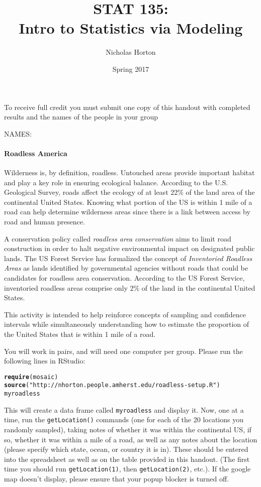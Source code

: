 \documentclass[10pt]{article}\usepackage[]{graphicx}\usepackage[]{color}
\title{STAT 135:\\Intro to Statistics via Modeling}
\author{Nicholas Horton}
\date{Spring 2017}
\makeatletter
\newcommand{\hlstr}[1]{\textcolor[rgb]{0.192,0.494,0.8}{#1}}%
\newcommand{\hlstd}[1]{\textcolor[rgb]{0.345,0.345,0.345}{#1}}%
\newcommand{\hlkwd}[1]{\textcolor[rgb]{0.737,0.353,0.396}{\textbf{#1}}}%
\newenvironment{kframe}{%
 \def\at@end@of@kframe{}%
 \ifinner\ifhmode%
  \def\at@end@of@kframe{\end{minipage}}%
  \begin{minipage}{\columnwidth}%
 \fi\fi%
 \def\FrameCommand##1{\hskip\@totalleftmargin \hskip-\fboxsep
 \colorbox{shadecolor}{##1}\hskip-\fboxsep
     \hskip-\linewidth \hskip-\@totalleftmargin \hskip\columnwidth}%
 \MakeFramed {\advance\hsize-\width
   \@totalleftmargin\z@ \linewidth\hsize
   \@setminipage}}%
 {\par\unskip\endMakeFramed%
 \at@end@of@kframe}
\newenvironment{knitrout}{}{} %
\makeatother
\begin{document}
\noindent
To receive full credit you must submit one copy of this handout with completed results and the names of the people in your group

\vspace{.1in}

\noindent
NAMES: 

\vspace{.4in}

  \paragraph{Roadless America}

Wilderness is, by definition, roadless.  Untouched areas provide important habitat and play a key role in ensuring ecological balance. According to the U.S. Geological Survey, roads affect the ecology of at least 22\% of the land area of the continental United States. Knowing what portion of the US is within 1 mile of a road can help determine wilderness areas since there is a link between access by road and human presence.

A conservation policy called \emph{roadless area conservation} aims to limit road construction in order to halt negative environmental impact on designated public lands. The US Forest Service has formalized the concept of \emph{Inventoried Roadless Areas} as lands identified by governmental agencies without roads that could be candidates for roadless area conservation. According to the US Forest Service, inventoried roadless areas comprise only 2\% of the land in the continental United States.

This activity is intended to help reinforce concepts of sampling and confidence intervals while simultaneously understanding how to estimate the proportion of the United States that is within 1 mile of a road. 

You will work in pairs, and will need one computer per group.  Please run the following lines in RStudio:
\begin{knitrout}
\color{fgcolor}\begin{kframe}
\begin{alltt}
\hlkwd{require}\hlstd{(mosaic)}
\hlkwd{source}\hlstd{(}\hlstr{"http://nhorton.people.amherst.edu/roadless-setup.R"}\hlstd{)}
\hlstd{myroadless}
\end{alltt}
\end{kframe}
\end{knitrout}
This will create a data frame called {\tt myroadless} and display it.
Now, one at a time, run the {\tt getLocation()} commands (one for each of the 20 locations you randomly sampled), taking notes of whether it was within the continental US, if so, whether it was within a mile of a road, as well as any notes about the location (please specify which state, ocean, or country it is in).  These should be entered into the spreadsheet as well as on the table provided in this handout.  (The first time you should run {\tt getLocation(1)}, then {\tt getLocation(2)}, etc.).  If the google map doesn't display, please ensure that your popup blocker is turned off.
\end{document}
